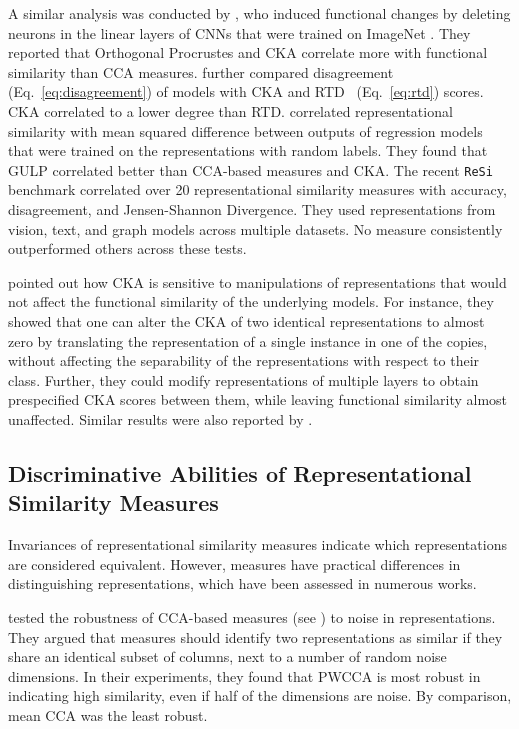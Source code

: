 \documentclass{article}
\newcommand{\citet}{\textcite}
\newcommand\myeqref[1]{%
    (\textup{Eq.~\ref{#1}})%
}
\begin{document}
\begin{refsegment}
A similar analysis was conducted by \citet{hayne2024does}, who induced functional changes by deleting neurons in the linear layers of CNNs that were trained on ImageNet \cite{deng_imagenet_2009}.
%
\hypertarget{test:disagreement}{}
They reported that Orthogonal Procrustes and CKA correlate more with functional similarity than CCA measures.
%
\hypertarget{test:squared_diff}{}
\citet{barannikov_representation_2022} further compared disagreement~\myeqref{eq:disagreement} of models with CKA and RTD~\myeqref{eq:rtd} scores. CKA correlated to a lower degree than RTD.
\hypertarget{test:jsd}{}
\citet{boix-adsera_gulp_2022} correlated representational similarity with mean squared difference between outputs of regression models that were trained on the representations with random labels.
They found that GULP correlated better than CCA-based measures and CKA.
The recent \texttt{ReSi} benchmark \cite{resi_benchmark_2024} correlated over 20 representational similarity measures with accuracy, disagreement, and Jensen-Shannon Divergence. They used representations from vision, text, and graph models across multiple datasets. No measure consistently outperformed others across these tests.

\citet{davari_inadequacy_2022} pointed out how CKA is sensitive to manipulations of representations that would not affect the functional similarity of the underlying models.
For instance, they showed that one can alter the CKA of two identical representations to almost zero by translating the representation of a single instance in one of the copies, without affecting the separability of the representations with respect to their class.
Further, they could modify representations of multiple layers to obtain prespecified CKA scores between them, while leaving functional similarity almost unaffected.
Similar results were also reported by \citet{csiszarik_similarity_2021}.



\subsection{Discriminative Abilities of Representational Similarity Measures} \label{subsec:discr_repsim}
Invariances of representational similarity measures indicate which representations are considered equivalent.
However, measures have practical differences in distinguishing representations, which have been assessed in numerous works.

\hypertarget{test:snr}{}
\citet{morcos_insights_2018} tested the robustness of CCA-based measures (see ) to noise in representations.
They argued that measures should identify two representations as similar if
they share an identical subset of columns, next to a number of random noise dimensions.
In their experiments, they found that PWCCA is most robust in indicating high similarity, even if half of the dimensions are noise. By comparison, mean CCA was the least robust.


\end{refsegment}
\end{document}
